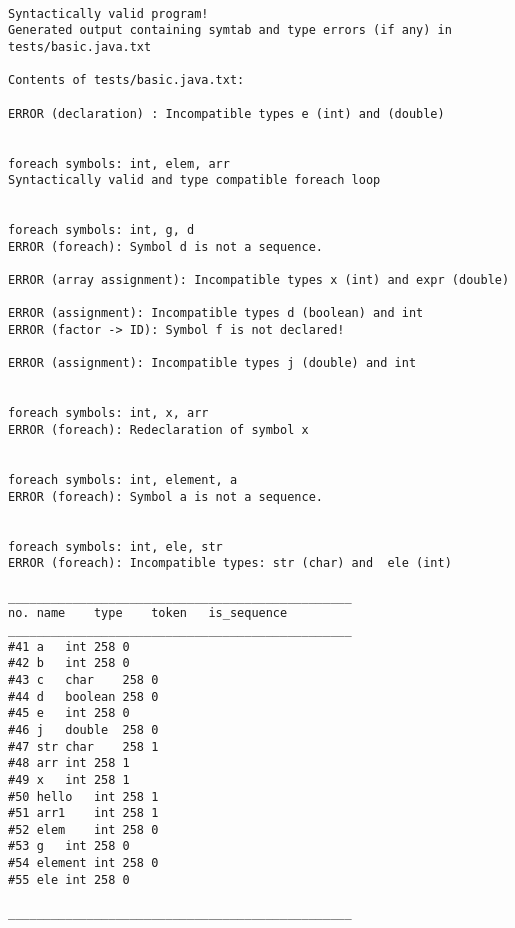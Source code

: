 \documentclass{article}
\begin{document}
\begin{lstlisting}

Syntactically valid program!
Generated output containing symtab and type errors (if any) in tests/basic.java.txt

Contents of tests/basic.java.txt:

ERROR (declaration) : Incompatible types e (int) and (double) 


foreach symbols: int, elem, arr
Syntactically valid and type compatible foreach loop


foreach symbols: int, g, d
ERROR (foreach): Symbol d is not a sequence.

ERROR (array assignment): Incompatible types x (int) and expr (double) 

ERROR (assignment): Incompatible types d (boolean) and int
ERROR (factor -> ID): Symbol f is not declared!

ERROR (assignment): Incompatible types j (double) and int


foreach symbols: int, x, arr
ERROR (foreach): Redeclaration of symbol x


foreach symbols: int, element, a
ERROR (foreach): Symbol a is not a sequence.


foreach symbols: int, ele, str
ERROR (foreach): Incompatible types: str (char) and  ele (int)

________________________________________________
no.	name	type	token	is_sequence
________________________________________________
#41	a	int	258	0
#42	b	int	258	0
#43	c	char	258	0
#44	d	boolean	258	0
#45	e	int	258	0
#46	j	double	258	0
#47	str	char	258	1
#48	arr	int	258	1
#49	x	int	258	1
#50	hello	int	258	1
#51	arr1	int	258	1
#52	elem	int	258	0
#53	g	int	258	0
#54	element	int	258	0
#55	ele	int	258	0

________________________________________________

\end{lstlisting}
\end{document}
